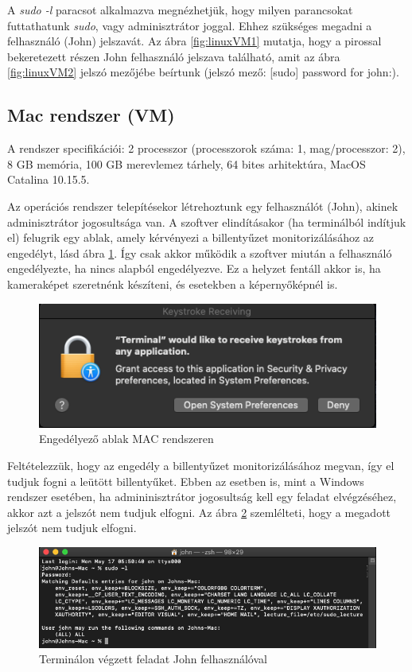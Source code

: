 \documentclass[12pt,a4paper,oneside]{report}
\begin{document}
A \textit{sudo -l} paracsot alkalmazva megnézhetjük, hogy milyen parancsokat futtathatunk \textit{sudo}, vagy adminisztrátor joggal. Ehhez szükséges megadni a felhasználó (John) jelszavát. Az ábra \ref{fig:linuxVM1} mutatja, hogy a pirossal bekeretezett részen John felhasználó jelszava található, amit az ábra \ref{fig:linuxVM2} jelszó mezőjébe beírtunk (jelszó mező: [sudo] password for john:).

\subsection{Mac rendszer (VM)}
A rendszer specifikációi: 2 processzor (processzorok száma: 1, mag/processzor: 2), 8 GB memória, 100 GB merevlemez tárhely, 64 bites arhitektúra, MacOS Catalina 10.15.5.

Az operációs rendszer telepítésekor létrehoztunk egy felhasználót (John), akinek adminisztrátor jogosultsága van. A szoftver elindításakor (ha terminálból indítjuk el) felugrik egy ablak, amely kérvényezi a billentyűzet monitorizálásához az engedélyt, lásd ábra \ref{fig:macVM1}. Így csak akkor működik a szoftver miután a felhasználó engedélyezte, ha nincs alapból engedélyezve. Ez a helyzet fentáll akkor is, ha kameraképet szeretnénk készíteni, és esetekben a képernyőképnél is.
\begin{figure}[H]
\centering
\includegraphics[width=400pt]{../images/macVM1}
\caption{Engedélyező ablak MAC rendszeren}
\label{fig:macVM1}
\end{figure}

Feltételezzük, hogy az engedély a billentyűzet monitorizálásához megvan, így el tudjuk fogni a leütött billentyűket. Ebben az esetben is, mint a Windows rendszer esetében, ha admininisztrátor jogosultság kell egy feladat elvégzéséhez, akkor azt a jelszót nem tudjuk elfogni. Az ábra \ref{fig:macVM2} szemlélteti, hogy a megadott jelszót nem tudjuk elfogni.
\begin{figure}[H]
\centering
\includegraphics[width=400pt]{../images/macVM2}
\caption{Terminálon végzett feladat John felhasználóval}
\label{fig:macVM2}
\end{figure}
\end{document}
